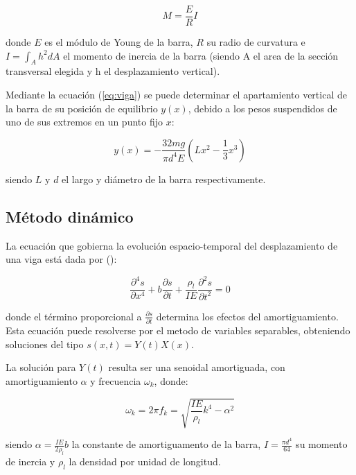 \documentclass[twoside,twocolumn,a4paper]{article}
\begin{document}
\begin{equation}
\label{eq:viga}
M = \frac{E}{R}I
\end{equation}

donde $E$ es el m\'odulo de Young de la barra, $R$ su radio de curvatura e $I = \int_{A} h^2 dA$ el momento de inercia de la barra (siendo A el area de la secci\'on transversal elegida y h el desplazamiento vertical). \newline

Mediante la ecuaci\'on (\ref{eq:viga}) se puede determinar el apartamiento vertical de la barra de su posici\'on de equilibrio $y(x)$, debido a los pesos suspendidos de uno de sus extremos en un punto fijo $x$:

\begin{equation}
\label{eq:vigafeynman}
y(x) = -\frac{32mg}{\pi d^{4}E}(Lx^{2} - \frac{1}{3}x^{3})
\end{equation}

siendo $L$ y $d$ el largo y di\'ametro de la barra respectivamente.\newline


\subsection{M\'etodo din\'amico}

La ecuaci\'on que gobierna la evoluci\'on espacio-temporal del desplazamiento de una viga est\'a dada por (\cite{eq:vigadyn}):

\begin{equation}
\label{eq:vigadyn}
\frac{\partial^4 s}{\partial x^4} + b\frac{\partial s}{\partial t} + \frac{\rho_{l}}{IE} \frac{\partial^2 s}{\partial t^2} = 0
\end{equation}

donde el t\'ermino proporcional a $\frac{\partial s}{\partial t}$ determina los efectos del amortiguamiento. Esta ecuaci\'on puede resolverse por el metodo de variables separables, obteniendo soluciones del tipo $s(x,t) = Y(t)X(x)$. \newline

La soluci\'on para $Y(t)$ resulta ser una senoidal amortiguada, con amortiguamiento $\alpha$ y frecuencia $\omega_{k}$, donde:

\begin{equation}
\label{eq:omegas}
\omega_{k} = 2\pi f_{k} = \sqrt{\frac{IE}{\rho_{l}}k^{4} - \alpha^2}
\end{equation}

siendo $\alpha = \frac{IE}{2\rho_{l}}b$ la constante de amortiguamento de la barra, $I = \frac{\pi d^4}{64}$ su momento de inercia y $\rho_{l}$ la densidad por unidad de longitud. \newline
\end{document}
